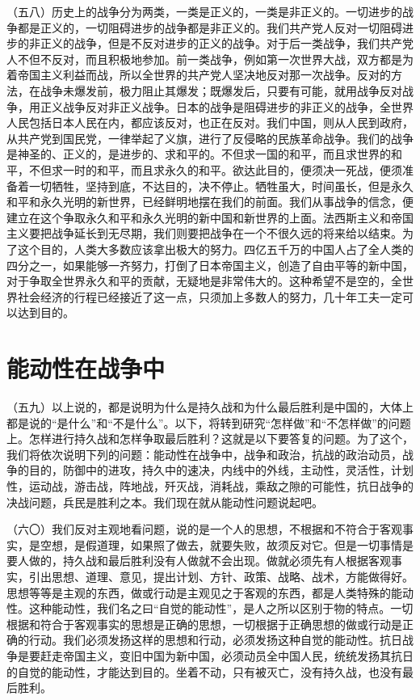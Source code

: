 （五八）历史上的战争分为两类，一类是正义的，一类是非正义的。一切进步的战争都是正义的，一切阻碍进步的战争都是非正义的。我们共产党人反对一切阻碍进步的非正义的战争，但是不反对进步的正义的战争。对于后一类战争，我们共产党人不但不反对，而且积极地参加。前一类战争，例如第一次世界大战，双方都是为着帝国主义利益而战，所以全世界的共产党人坚决地反对那一次战争。反对的方法，在战争未爆发前，极力阻止其爆发；既爆发后，只要有可能，就用战争反对战争，用正义战争反对非正义战争。日本的战争是阻碍进步的非正义的战争，全世界人民包括日本人民在内，都应该反对，也正在反对。我们中国，则从人民到政府，从共产党到国民党，一律举起了义旗，进行了反侵略的民族革命战争。我们的战争是神圣的、正义的，是进步的、求和平的。不但求一国的和平，而且求世界的和平，不但求一时的和平，而且求永久的和平。欲达此目的，便须决一死战，便须准备着一切牺牲，坚持到底，不达目的，决不停止。牺牲虽大，时间虽长，但是永久和平和永久光明的新世界，已经鲜明地摆在我们的前面。我们从事战争的信念，便建立在这个争取永久和平和永久光明的新中国和新世界的上面。法西斯主义和帝国主义要把战争延长到无尽期，我们则要把战争在一个不很久远的将来给以结束。为了这个目的，人类大多数应该拿出极大的努力。四亿五千万的中国人占了全人类的四分之一，如果能够一齐努力，打倒了日本帝国主义，创造了自由平等的新中国，对于争取全世界永久和平的贡献，无疑地是非常伟大的。这种希望不是空的，全世界社会经济的行程已经接近了这一点，只须加上多数人的努力，几十年工夫一定可以达到目的。

\section{能动性在战争中}

（五九）以上说的，都是说明为什么是持久战和为什么最后胜利是中国的，大体上都是说的“是什么”和“不是什么”。以下，将转到研究“怎样做”和“不怎样做”的问题上。怎样进行持久战和怎样争取最后胜利？这就是以下要答复的问题。为了这个，我们将依次说明下列的问题：能动性在战争中，战争和政治，抗战的政治动员，战争的目的，防御中的进攻，持久中的速决，内线中的外线，主动性，灵活性，计划性，运动战，游击战，阵地战，歼灭战，消耗战，乘敌之隙的可能性，抗日战争的决战问题，兵民是胜利之本。我们现在就从能动性问题说起吧。

（六〇）我们反对主观地看问题，说的是一个人的思想，不根据和不符合于客观事实，是空想，是假道理，如果照了做去，就要失败，故须反对它。但是一切事情是要人做的，持久战和最后胜利没有人做就不会出现。做就必须先有人根据客观事实，引出思想、道理、意见，提出计划、方针、政策、战略、战术，方能做得好。思想等等是主观的东西，做或行动是主观见之于客观的东西，都是人类特殊的能动性。这种能动性，我们名之曰“自觉的能动性”，是人之所以区别于物的特点。一切根据和符合于客观事实的思想是正确的思想，一切根据于正确思想的做或行动是正确的行动。我们必须发扬这样的思想和行动，必须发扬这种自觉的能动性。抗日战争是要赶走帝国主义，变旧中国为新中国，必须动员全中国人民，统统发扬其抗日的自觉的能动性，才能达到目的。坐着不动，只有被灭亡，没有持久战，也没有最后胜利。

